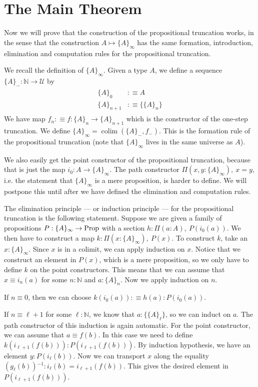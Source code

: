 \documentclass[square]{sigplanconf}
\newcommand{\fa}[2]{\ensuremath{\Pi(#1),\ #2}}
\DeclareMathOperator{\colim}{colim}
\newcommand{\prop}{\textnormal{Prop}}
\newcommand{\N}{\mathbb{N}}
\newcommand{\U}{\mathcal{U}}
\newcommand{\sy}{\ensuremath{^{-1}}}
\theoremstyle{definition}
\theoremstyle{remark}
\begin{document}
\section{The Main Theorem}\label{s:proof}

Now we will prove that the construction of the propositional truncation works, in the sense that the
construction $A\mapsto \{A\}_\infty$ has the same formation, introduction, elimination and
computation rules for the propositional truncation.

We recall the definition of $\{A\}_\infty$. Given a type $A$, we define a sequence
$\{A\}_{-}:\N\to\U$ by
\begin{align}
\begin{aligned}
\{A\}_0&:\equiv A\\ \{A\}_{n+1}&:\equiv \{\{A\}_n\}
\end{aligned}
\label{e:An}
\end{align}
We have map $f_n:\equiv f : \{A\}_n\to \{A\}_{n+1}$ which is the constructor of the one-step
truncation. We define $\{A\}_\infty=\colim(\{A\}_{-},f_{-})$. This is the formation rule of the
propositional truncation (note that $\{A\}_\infty$ lives in the same universe as $A$).

We also easily get the point constructor of the propositional truncation, because that is just the
map $i_0:A\to \{A\}_\infty$. The path constructor $\fa{x, y : \{A\}_\infty}{x = y}$, i.e. the
statement that $\{A\}_\infty$ is a mere proposition, is harder to define. We will postpone this
until after we have defined the elimination and computation rules.

The elimination principle --- or induction principle --- for the propositional truncation is the
following statement. Suppose we are given a family of propositions $P : \{A\}_\infty \to \prop$ with
a section $h : \fa{a : A}{P(i_0(a))}$. We then have to construct a map $k : \fa{x :
  \{A\}_\infty}{P(x)}$. To construct $k$, take an $x : \{A\}_\infty$. Since $x$ is in a colimit, we
can apply induction on $x$. Notice that we construct an element in $P(x)$, which is a mere
proposition, so we only have to define $k$ on the point constructors. This means that we can assume
that $x\equiv i_n(a)$ for some $n : \N$ and $a:\{A\}_n$. Now we apply induction on $n$.

If $n\equiv0$, then we can choose $k(i_0(a)):\equiv h(a):P(i_0(a))$.

If $n\equiv \ell+1$ for some $\ell:\N$, we know that $a:\{\{A\}_\ell\}$, so we can induct on
$a$. The path constructor of this induction is again automatic. For the point constructor, we can
assume that $a\equiv f(b)$. In this case we need to define $k(i_{\ell+1}(f(b))) :
P(i_{\ell+1}(f(b)))$. By induction hypothesis, we have an element $y : P(i_\ell(b))$. Now we can
transport $x$ along the equality $(g_\ell(b))\sy : i_\ell(b)=i_{\ell+1}(f(b))$. This gives the
desired element in $P(i_{\ell+1}(f(b)))$.
\end{document}
